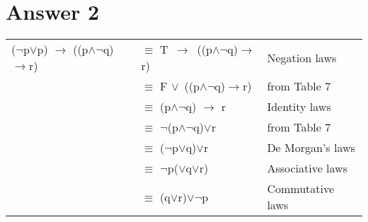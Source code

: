 \documentclass[12pt]{article}
\begin{document}
\section*{Answer 2}
\begin{table}[ht]
\centering
\begin{tabular}{|lll|} 
\hline
($\neg$p$\lor$p) $\rightarrow$ ((p$\land$$\neg$q)$\rightarrow$r) & $\equiv$ T~$\rightarrow$~((p$\land$$\neg$q)$\rightarrow$r) & Negation laws     \\
                                                                                                                                                                       & $\equiv$ F $\lor$~((p$\land$$\neg$q)$\rightarrow$r)        & from Table 7     \\
                                                                                                                                                                       & $\equiv$ (p$\land$$\neg$q) $\rightarrow$ r                                  & Identity laws     \\
                                                                                                                                                                       & $\equiv$ $\neg$(p$\land$$\neg$q)$\lor$r                                              & from Table 7     \\ & $\equiv$ ($\neg$p$\lor$q)$\lor$r                                            & De Morgan's laws  \\ & $\equiv$ $\neg$p($\lor$q$\lor$r)                                            & Associative laws  \\
                                                                                                                                                                       & $\equiv$ (q$\lor$r)$\lor$$\neg$p                                            & Commutative laws  \\ 
\hline
\end{tabular}
\end{table}
\end{document}
